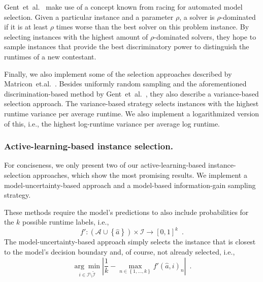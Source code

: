 \documentclass[runningheads]{llncs}
\begin{document}
Gent~et~al.~\cite{GentHJKMNN14} make use of a concept known from racing for automated model selection.
Given a particular instance and a parameter $\rho$, a solver is $\rho$-dominated if it is at least $\rho$ times worse than the best solver on this problem instance.
By selecting instances with the highest amount of $\rho$-dominated solvers, they hope to sample instances that provide the best discriminatory power to distinguish the runtimes of a new contestant.

Finally, we also implement some of the selection approaches described by Matricon~et.al.~\cite{MatriconAFSH21}.
Besides uniformly random sampling and the aforementioned discrimination-based method by Gent~et~al.~\cite{GentHJKMNN14}, they also describe a variance-based selection approach.
The variance-based strategy selects instances with the highest runtime variance per average runtime.
We also implement a logarithmized version of this, i.e., the highest log-runtime variance per average log runtime.
 
\subsubsection{Active-learning-based instance selection.}
\label{sec:sampling2}
For conciseness, we only present two of our active-learning-based instance-selection approaches, which show the most promising results.
We implement a model-uncertainty-based approach and a model-based information-gain sampling strategy.

These methods require the model's predictions to also include probabilities for the $k$ possible runtime labels, i.e., 
\begin{equation}
  f'\!: \left(\mathcal{A} \cup \left\lbrace \hat{a} \right\rbrace\right) \times \mathcal{I} \rightarrow \left[0, 1\right]^k  \enspace \textrm{.}
\end{equation}
The model-uncertainty-based approach simply selects the instance that is closest to the model's decision boundary and, of course, not already selected, i.e.,
\begin{equation}
  \underset{i \in \mathcal{I} \setminus \tilde{\mathcal{I}}}{\arg\min} \left\lvert \frac{1}{k} - \max_{n \in \left\lbrace 1, \dots, k \right\rbrace} f'\!\left(\hat{a}, i\right)_{n} \right\rvert \enspace \textrm{.}
\end{equation}
\end{document}
